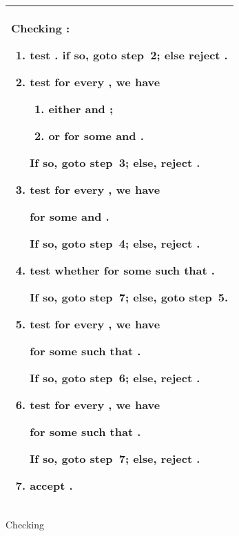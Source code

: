 \documentclass{llncs}
\begin{document}
\begin{figure}[tbp]
\begin{center}
\begin{tabular}{|p{12cm}|}\hline \vspace{0ex}
\textbf{\normalsize Checking  :}
\begin{enumerate}
\item
\textbf{test}  . if so, goto step~2; else \textbf{reject} . \vspace{1ex}

\item
\textbf{test} for every , we have
\begin{enumerate}
\item
    either   and ;

\item
     or  for some  and .
\end{enumerate}
If so, goto step~3; else, \textbf{reject} . \vspace{1ex}

\item
\textbf{test} for every , we have

  for some  and .

If so, goto step~4; else, \textbf{reject} . \vspace{1ex}



\item
\textbf{test} whether  for some  such that .

If so, goto step~7; else, goto step~5. \vspace{1ex}

\item
\textbf{test}  for every , we have

     for some  such that .

If so, goto step~6; else, \textbf{reject} . \vspace{1ex}

\item
\textbf{test}  for every  , we have

     for some  such that .

If so, goto step~7; else, \textbf{reject} . \vspace{1ex}

\item
\textbf{accept} .
\vspace{-1ex}
\end{enumerate} \\
        \hline
\end{tabular}\vspace{-1ex}
\end{center}
\caption{Checking  }\label{Checking_EXP}
\end{figure}
\end{document}
